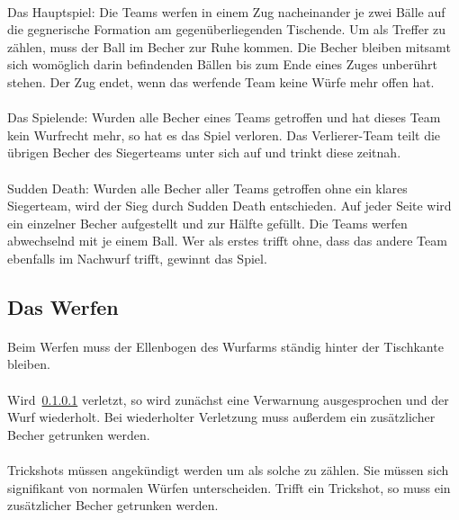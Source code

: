 \paragraph{}
Das Hauptspiel: Die Teams werfen in einem Zug nacheinander je zwei Bälle auf die gegnerische Formation am gegenüberliegenden Tischende.
Um als Treffer zu zählen, muss der Ball im Becher zur Ruhe kommen.
Die Becher bleiben mitsamt sich womöglich darin befindenden Bällen bis zum Ende eines Zuges unberührt stehen.
Der Zug endet, wenn das werfende Team keine Würfe mehr offen hat.

\paragraph{}
Das Spielende: Wurden alle Becher eines Teams getroffen und hat dieses Team kein Wurfrecht mehr, so hat es das Spiel verloren.
Das Verlierer-Team teilt die übrigen Becher des Siegerteams unter sich auf und trinkt diese zeitnah.

\paragraph{}
\glqq{} Sudden Death\grqq{}: Wurden alle Becher aller Teams getroffen ohne ein klares Siegerteam, wird der Sieg durch Sudden Death entschieden.
Auf jeder Seite wird ein einzelner Becher aufgestellt und zur Hälfte gefüllt.
Die Teams werfen abwechselnd mit je einem Ball.
Wer als erstes trifft ohne, dass das andere Team ebenfalls im Nachwurf trifft, gewinnt das Spiel.

\subsection{Das Werfen}
\paragraph{}\label{Bier-Pong:Werfen:Ellenbogen}
Beim Werfen muss der Ellenbogen des Wurfarms ständig hinter der Tischkante bleiben.

\paragraph{}
Wird~\ref{Bier-Pong:Werfen:Ellenbogen} verletzt, so wird zunächst eine Verwarnung ausgesprochen und der Wurf wiederholt.
Bei wiederholter Verletzung muss außerdem ein zusätzlicher Becher getrunken werden.

\paragraph{}
\glqq{} Trickshots\grqq{} müssen angekündigt werden um als solche zu zählen.
Sie müssen sich signifikant von normalen Würfen unterscheiden.
Trifft ein Trickshot, so muss ein zusätzlicher Becher getrunken werden.

